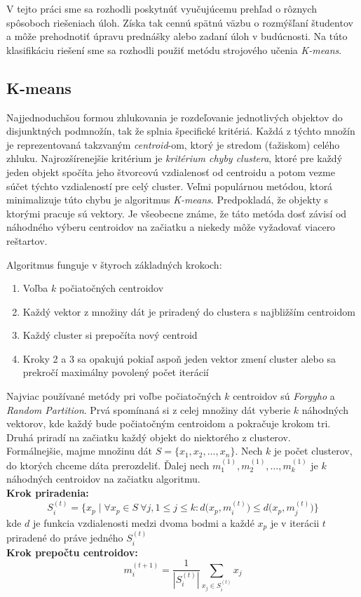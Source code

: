 V tejto práci sme sa rozhodli poskytnúť vyučujúcemu prehľad o
rôznych spôsoboch riešeniach úloh. Získa tak cennú spätnú väzbu o rozmýšľaní študentov
a môže prehodnotiť úpravu prednášky alebo zadaní úloh v budúcnosti. Na túto klasifikáciu riešení
sme sa rozhodli použiť metódu strojového učenia \textit{K-means}.

\subsection{K-means}
\label{sec:solutionclusterizing:kmeans}

Najjednoduchšou formou zhlukovania je rozdeľovanie jednotlivých objektov do
disjunktných podmnožín, tak že splnia špecifické kritériá. Každá z týchto množín je reprezentovaná takzvaným \textit{centroid}-om, ktorý je stredom (ťažiskom) celého zhluku.
Najrozšírenejšie kritérium je \textit{kritérium chyby clustera}, ktoré pre každý
jeden objekt spočíta jeho štvorcovú vzdialenosť od centroidu a potom vezme
súčet týchto vzdialeností pre celý cluster. Veľmi populárnou metódou, ktorá minimalizuje
túto chybu je algoritmus \textit{K-means}. Predpokladá, že objekty s ktorými pracuje
sú vektory. Je všeobecne známe, že táto metóda dosť
závisí od náhodného výberu centroidov na začiatku a niekedy môže vyžadovať viacero
reštartov.~\cite{bib:globalkmeans}

Algoritmus funguje v štyroch základných krokoch:
\begin{enumerate}
	\item Voľba $k$ počiatočných centroidov
	\item Každý vektor z množiny dát je priradený do clustera s najbližším centroidom
	\item Každý cluster si prepočíta nový centroid
	\item Kroky 2 a 3 sa opakujú pokiaľ aspoň jeden vektor zmení cluster alebo
		sa prekročí maximálny povolený počet iterácií
\end{enumerate}

Najviac používané metódy pri voľbe počiatočných $k$ centroidov sú \textit{Forgyho} a
\textit{Random Partition}. Prvá spomínaná si z celej množiny dát vyberie $k$ náhodných
vektorov, kde každý bude počiatočným centroidom a pokračuje krokom tri.
Druhá priradí na začiatku každý objekt do niektorého z clusterov. \\

Formálnejšie, majme množinu dát $S=\{x_1, x_2, \ldots , x_n\}$. Nech $k$ je počet
clusterov, do ktorých chceme dáta prerozdeliť. Ďalej nech
$m_1^{(1)}, m_2^{(1)}, \ldots, m_k^{(1)}$ je $k$ náhodných centroidov na začiatku
algoritmu.\\
\textbf{Krok priradenia:}
$$S_i^{(t)}=\Big\{ x_p \mid
\forall x_p\in S~
\forall j, 1\leq j \leq k:
{d\big(x_p, m_i^{(t)}\big)} \leq 
{d\big(x_p, m_j^{(t)}\big)}\Big\}$$
kde $d$ je funkcia vzdialenosti medzi dvoma bodmi a každé $x_p$ je v iterácii $t$
priradené do práve jedného $S_i^{(t)}$ \\
\textbf{Krok prepočtu centroidov:}
$$m_i^{(t+1)}=\frac{1}{|S_i^{(t)}|} \sum_{x_j\in S_i^{(t)}} x_j$$

